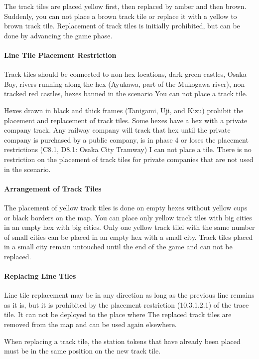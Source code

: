 \documentclass{article}
\begin{document}
\begin{CJK}{UTF8}{min}
The track tiles are placed yellow first, then replaced by amber and
then brown. Suddenly, you can not place a brown track tile or replace
it with a yellow to brown track tile. Replacement of track tiles is
initially prohibited, but can be done by advancing the game phase.

\paragraph{Line Tile Placement Restriction}
Track tiles should be connected to non-hex locations, dark green
castles, Osaka Bay, rivers running along the hex (Ayukawa, part of the
Mukogawa river), non-tracked red castles, hexes banned in the scenario
You can not place a track tile.

Hexes drawn in black and thick frames (Tanigami, Uji, and Kizu)
prohibit the placement and replacement of track tiles. Some hexes have
a hex with a private company track. Any railway company will track
that hex until the private company is purchased by a public company,
is in phase 4 or loses the placement restrictions (C8.1, D8.1: Osaka
City Tramway) I can not place a tile. There is no restriction on the
placement of track tiles for private companies that are not used in
the scenario.

\paragraph{Arrangement of Track Tiles}
The placement of yellow track tiles is done on empty hexes without
yellow cups or black borders on the map. You can place only yellow
track tiles with big cities in an empty hex with big cities. Only one
yellow track tilel with the same number of small cities can be placed
in an empty hex with a small city. Track tiles placed in a small city
remain untouched until the end of the game and can not be replaced.

\paragraph{Replacing Line Tiles}
Line tile replacement may be in any direction as long as the previous
line remains as it is, but it is prohibited by the placement
restriction (10.3.1.2.1) of the trace tile. It can not be deployed to
the place where The replaced track tiles are removed from the map and
can be used again elsewhere.

When replacing a track tile, the station tokens that have already been
placed must be in the same position on the new track tile.


\end{CJK}
\end{document}
